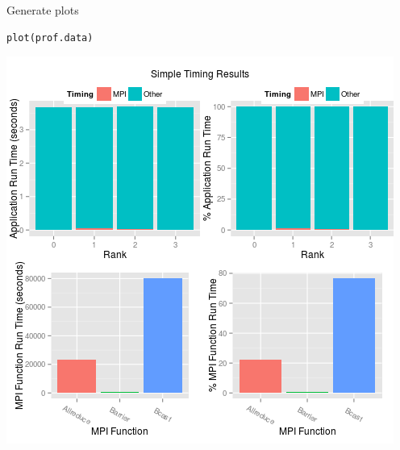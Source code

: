 \begin{frame}[fragile]
  \begin{block}{Generate plots}
  \begin{center}\vspace{-.6cm}
\begin{lstlisting}
plot(prof.data)
\end{lstlisting}\vspace{-.2cm}
\includegraphics[scale=.39]{../common/pics/prof/timing.png}
\end{center}
  \end{block}
\end{frame}


